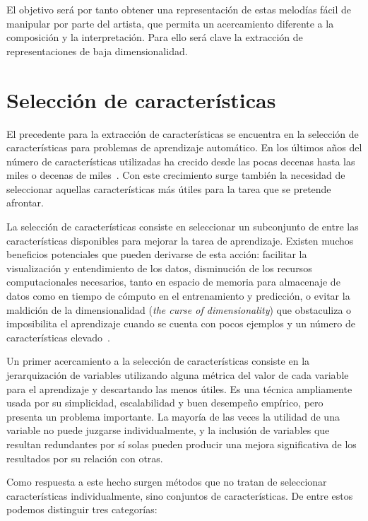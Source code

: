 El objetivo será por tanto obtener una representación de estas melodías fácil de manipular por parte del artista, que permita un acercamiento diferente a la composición y la interpretación. Para ello será clave la extracción de representaciones de baja dimensionalidad.

\section{Selección de características}
El precedente para la extracción de características se encuentra en la selección de características para problemas de aprendizaje automático. En los últimos años del número de características utilizadas ha crecido desde las pocas decenas hasta las miles o decenas de miles~\cite{guyon2003introduction}. Con este crecimiento surge también la necesidad de seleccionar aquellas características más útiles para la tarea que se pretende afrontar.

La selección de características consiste en seleccionar un subconjunto de entre las características disponibles para mejorar la tarea de aprendizaje. Existen muchos beneficios potenciales que pueden derivarse de esta acción: facilitar la visualización y entendimiento de los datos, disminución de los recursos computacionales necesarios, tanto en espacio de memoria para almacenaje de datos como en tiempo de cómputo en el entrenamiento y predicción, o evitar la maldición de la dimensionalidad (\textit{the curse of dimensionality}) que obstaculiza o imposibilita el aprendizaje cuando se cuenta con pocos ejemplos y un número de características elevado~\cite{beyer1999nearest}.

Un primer acercamiento a la selección de características consiste en la jerarquización de variables utilizando alguna métrica del valor de cada variable para el aprendizaje y descartando las menos útiles. Es una técnica ampliamente usada por su simplicidad, escalabilidad y buen desempeño empírico, pero presenta un problema importante. La mayoría de las veces la utilidad de una variable no puede juzgarse individualmente, y la inclusión de variables que resultan redundantes por sí solas pueden producir una mejora significativa de los resultados por su relación con otras.

Como respuesta a este hecho surgen métodos que no tratan de seleccionar características individualmente, sino conjuntos de características. De entre estos podemos distinguir tres categorías:

